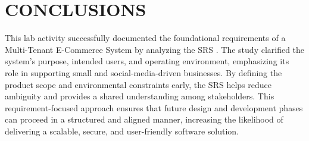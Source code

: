 \chapter{CONCLUSIONS}\label{ch:conclusion}

This lab activity successfully documented the foundational requirements of a Multi-Tenant E-Commerce System by analyzing the SRS . The study clarified the system’s purpose, intended users, and operating environment, emphasizing its role in supporting small and social-media-driven businesses. By defining the product scope and environmental constraints early, the SRS helps reduce ambiguity and provides a shared understanding among stakeholders. This requirement-focused approach ensures that future design and development phases can proceed in a structured and aligned manner, increasing the likelihood of delivering a scalable, secure, and user-friendly software solution.